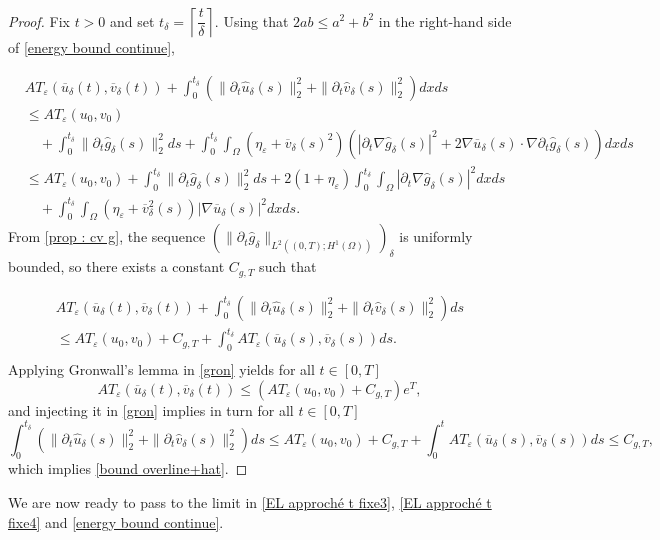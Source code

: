 \documentclass[reqno,12pt,twoside]{amsart}
\numberwithin{equation}{section} \numberwithin{theorem}{section}
\numberwithin{proposition}{section} \numberwithin{lemma}{section}
\numberwithin{corollary}{section}
\numberwithin{definition}{section} \numberwithin{remark}{section}
\begin{document}
\begin{proof}
Fix $t >0$ and set $t_\delta = \left\lceil \dfrac{t}{\delta}\right\rceil$. Using that $2ab\leqslant a^2 +b^2$ in the right-hand side of \eqref{energy bound continue}, 

\begin{align*}
&AT_\varepsilon (\overline{u}_\delta (t) , \overline{v}_\delta (t)) + \int_0^{t_\delta} \left(\|\partial_t \hat{u}_\delta (s)\|_2^2 + \|\partial_t \hat{v}_\delta (s)\|_2^2\right)dx ds \\
&\leqslant AT_\varepsilon (u_0 , v_0)\\
&\quad + \int_0^{t_\delta} \|\partial_t \hat{g}_\delta (s)\|_2^2ds + \int_0^{t_\delta}\int_\Omega (\eta_\varepsilon + \overline{v}_\delta(s)^2)\left(|\partial_t \nabla \hat{g}_\delta (s)|^2 + 2 \nabla \overline{u}_\delta (s)\cdot \nabla \partial_t \hat{g}_\delta (s)\right) dxds\\
&\leqslant AT_\varepsilon (u_0 , v_0) + \int_0^{t_\delta} \|\partial_t \hat{g}_\delta(s)\|_2^2 ds + 2(1+\eta_\varepsilon) \int_0^{t_\delta}\int_\Omega |\partial_t \nabla \hat{g}_\delta(s)|^2 dxds\\
&\quad +\int_0^{t_\delta} \int_\Omega (\eta_\varepsilon + \overline{v}_\delta^2(s)) |\nabla \overline{u}_\delta (s)|^2 dxds .
\end{align*}
From \autoref{prop : cv g}, the sequence $(\|\partial_t \hat{g}_\delta\|_{L^2((0,T);H^1(\Omega))})_\delta$ is uniformly bounded, so there exists a constant $C_{g,T}$ such that  

\begin{multline}\label{gron}
AT_\varepsilon (\overline{u}_\delta (t) , \overline{v}_\delta (t)) + \int_0^{t_\delta} \left(\|\partial_t \hat{u}_\delta (s)\|_2^2 + \|\partial_t \hat{v}_\delta (s)\|_2^2 \right)ds\\
\leqslant  AT_\varepsilon (u_0, v_0) + C_{g,T} + \int_0^{t_\delta} AT_\varepsilon (\overline{u}_\delta (s), \overline{v}_\delta (s))ds.\\ 
\end{multline}
Applying Gronwall's lemma in \eqref{gron} yields for all $t\in [0,T]$
\begin{equation}\label{gron2}
AT_\varepsilon (\overline{u}_\delta (t) , \overline{v}_\delta (t)) \leqslant (AT_\varepsilon (u_0, v_0) + C_{g,T}) e^T,
\end{equation} 
and injecting it in \eqref{gron} implies in turn for all $t\in [0,T]$
\begin{equation}\label{gron 3}
\int_0^{t_\delta} \left(\|\partial_t \hat{u}_\delta(s)\|_2^2 + \|\partial_t \hat{v}_\delta(s)\|_2^2\right)ds \leqslant  AT_\varepsilon (u_0, v_0) + C_{g,T} + \int_0^t AT_\varepsilon (\overline{u}_\delta (s), \overline{v}_\delta (s))ds \leqslant C_{g,T},
\end{equation}
which implies \eqref{bound overline+hat}. 
\end{proof}
We are now ready to pass to the limit in \eqref{EL approché t fixe3}, \eqref{EL approché t fixe4} and \eqref{energy bound continue}. 
\end{document}
